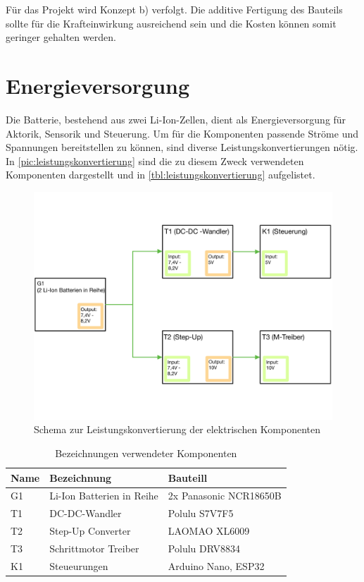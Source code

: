 Für das Projekt wird Konzept b) verfolgt. Die additive Fertigung des Bauteils sollte für die Krafteinwirkung ausreichend sein und die Kosten können somit geringer gehalten werden. 

\newpage

\section{Energieversorgung}
\label{sec:konzeptEnergieversorgung}
Die Batterie, bestehend aus zwei Li-Ion-Zellen, dient als Energieversorgung für Aktorik, Sensorik und Steuerung. Um für die Komponenten passende Ströme und Spannungen bereitstellen zu können, sind diverse Leistungskonvertierungen nötig. In \autoref{pic:leistungskonvertierung} sind die zu diesem Zweck verwendeten Komponenten dargestellt und in \autoref{tbl:leistungskonvertierung} aufgelistet. 

\begin{figure}[h]
	\begin{center}
		\includegraphics[width=12cm]{leistungskonvertierung.pdf}
		\caption{Schema zur Leistungskonvertierung der elektrischen Komponenten}
		\label{pic:leistungskonvertierung}
	\end{center}
\end{figure}


\begin{table}[h]
	\begin{center}
		\begin{tabular}[h]{l|l|l}
			\textbf{Name} & \textbf{Bezeichnung} & \textbf{Bauteill}\\
			\hline
			G1 & Li-Ion Batterien in Reihe & 2x Panasonic NCR18650B\\
			\hline
			T1 & DC-DC-Wandler & Polulu S7V7F5\\
			\hline
			T2 & Step-Up Converter & LAOMAO XL6009 \\
			\hline
			T3 & Schrittmotor Treiber & Polulu DRV8834 \\
			\hline
			K1 & Steueurungen & Arduino Nano, ESP32 \\
		\end{tabular}
	\end{center}
	\caption{Bezeichnungen verwendeter Komponenten}
	\label{tbl:leistungskonvertierung}
\end{table}
\newpage


